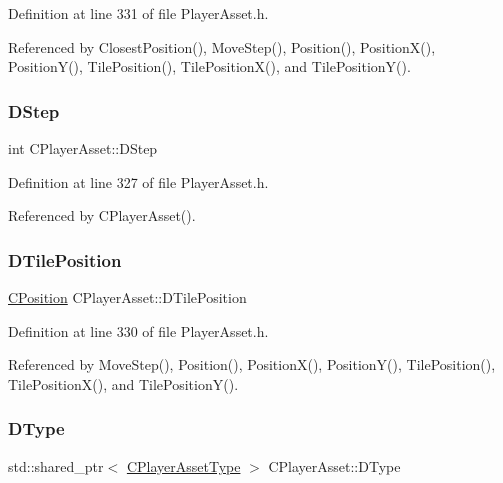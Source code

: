 Definition at line 331 of file Player\+Asset.\+h.



Referenced by Closest\+Position(), Move\+Step(), Position(), Position\+X(), Position\+Y(), Tile\+Position(), Tile\+Position\+X(), and Tile\+Position\+Y().

\hypertarget{classCPlayerAsset_a7964d2161d51b3edd66fbc9c59eba4b0}{}\label{classCPlayerAsset_a7964d2161d51b3edd66fbc9c59eba4b0} 
\subsubsection{\texorpdfstring{D\+Step}{DStep}}
{\footnotesize\ttfamily int C\+Player\+Asset\+::\+D\+Step\hspace{0.3cm}{\ttfamily [protected]}}



Definition at line 327 of file Player\+Asset.\+h.



Referenced by C\+Player\+Asset().

\hypertarget{classCPlayerAsset_a5b59a9d3b7db8c7fa194b80dafb96186}{}\label{classCPlayerAsset_a5b59a9d3b7db8c7fa194b80dafb96186} 
\subsubsection{\texorpdfstring{D\+Tile\+Position}{DTilePosition}}
{\footnotesize\ttfamily \hyperlink{classCPosition}{C\+Position} C\+Player\+Asset\+::\+D\+Tile\+Position\hspace{0.3cm}{\ttfamily [protected]}}



Definition at line 330 of file Player\+Asset.\+h.



Referenced by Move\+Step(), Position(), Position\+X(), Position\+Y(), Tile\+Position(), Tile\+Position\+X(), and Tile\+Position\+Y().

\hypertarget{classCPlayerAsset_a5d61f73471e1e6f0a6ab15f2ffa7b359}{}\label{classCPlayerAsset_a5d61f73471e1e6f0a6ab15f2ffa7b359} 
\subsubsection{\texorpdfstring{D\+Type}{DType}}
{\footnotesize\ttfamily std\+::shared\+\_\+ptr$<$ \hyperlink{classCPlayerAssetType}{C\+Player\+Asset\+Type} $>$ C\+Player\+Asset\+::\+D\+Type\hspace{0.3cm}{\ttfamily [protected]}}



